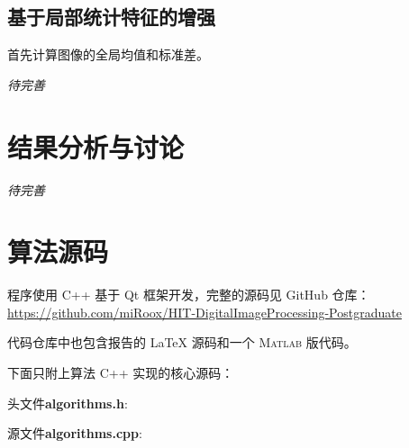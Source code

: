 \documentclass{hitgsrep}
\newcommand{\todo}{{\emph{待完善}\par}}
\begin{document}
\subsection{基于局部统计特征的增强}

首先计算图像的全局均值和标准差。

\todo

\section{结果分析与讨论}

\todo

\appendix

\section{算法源码}

程序使用 C++ 基于 Qt 框架开发，完整的源码见 GitHub 仓库：\\
\url{https://github.com/miRoox/HIT-DigitalImageProcessing-Postgraduate}

代码仓库中也包含报告的 \LaTeX{} 源码和一个 \textsc{Matlab} 版代码。

下面只附上算法 C++ 实现的核心源码：

\noindent 头文件\textbf{algorithms.h}:


\noindent 源文件\textbf{algorithms.cpp}:

\end{document}
